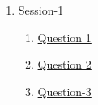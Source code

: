 \clearpage
\renewcommand{\notetitle}{Table of Contents}
\label{toc}
\begin{enumerate}

\item Session-1
\begin{enumerate}
\item \hyperref[202501120904]{Question 1}
\item \hyperref[202501121340]{Question 2}
\item \hyperref[202501121522]{Question-3}
\end{enumerate}
\end{enumerate}

\newpage

